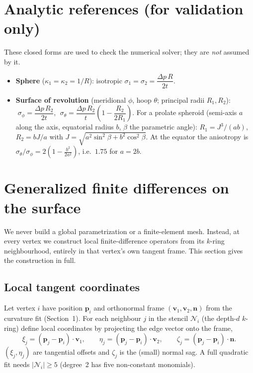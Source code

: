 \documentclass[11pt]{article}
\newcommand{\vv}[1]{\bm{#1}}
\newcommand{\kone}{\kappa_1}
\newcommand{\ktwo}{\kappa_2}
\begin{document}
\section{Analytic references (for validation only)}

These closed forms are used to check the numerical solver; they are \emph{not} assumed by
it.
\begin{itemize}[noitemsep]
  \item \textbf{Sphere} ($\kone=\ktwo=1/R$): isotropic $\sigma_1=\sigma_2=\dfrac{\Delta p\,R}{2t}$.
  \item \textbf{Surface of revolution} (meridional $\phi$, hoop $\theta$; principal radii
        $R_1,R_2$): $\;\sigma_\phi=\dfrac{\Delta p\,R_2}{2t}$,
        $\;\sigma_\theta=\dfrac{\Delta p\,R_2}{t}\!\left(1-\dfrac{R_2}{2R_1}\right)$.
        For a prolate spheroid (semi-axis $a$ along the axis, equatorial radius $b$,
        $\beta$ the parametric angle): $R_1=J^3/(ab)$, $R_2=bJ/a$ with
        $J=\sqrt{a^2\sin^2\beta+b^2\cos^2\beta}$. At the equator the anisotropy is
        $\sigma_\theta/\sigma_\phi = 2\!\left(1-\tfrac{b^2}{2a^2}\right)$, i.e.\ $1.75$ for $a=2b$.
\end{itemize}

\section{Generalized finite differences on the surface}\label{sec:gfdm}

We never build a global parametrization or a finite-element mesh. Instead, at every vertex
we construct local finite-difference operators from its $k$-ring neighbourhood, entirely in
that vertex's own tangent frame. This section gives the construction in full.

\subsection{Local tangent coordinates}
Let vertex $i$ have position $\vv p_i$ and orthonormal frame $(\vv v_1,\vv v_2,\vv n)$ from
the curvature fit (Section~1). For each neighbour $j$ in the stencil $\mathcal N_i$ (the
depth-$d$ $k$-ring) define local coordinates by projecting the edge vector onto the frame,
\begin{equation}
  \xi_j=(\vv p_j-\vv p_i)\!\cdot\!\vv v_1,\qquad
  \eta_j=(\vv p_j-\vv p_i)\!\cdot\!\vv v_2,\qquad
  \zeta_j=(\vv p_j-\vv p_i)\!\cdot\!\vv n .
\end{equation}
$(\xi_j,\eta_j)$ are tangential offsets and $\zeta_j$ is the (small) normal sag. A full
quadratic fit needs $|\mathcal N_i|\ge5$ (degree~2 has five non-constant monomials).
\end{document}
